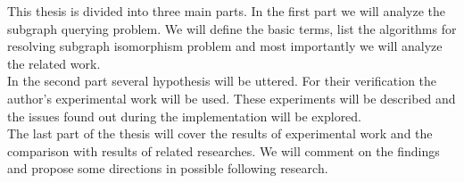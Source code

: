 This thesis is divided into three main parts. In the first part we will analyze the subgraph querying problem. We will define the basic terms, list the algorithms for resolving subgraph isomorphism problem and most importantly we will analyze the related work. \\

In the second part several hypothesis will be uttered. For their verification the author’s experimental work will be used. These experiments will be described and the issues found out during the implementation will be explored.\\

The last part of the thesis will cover the results of experimental work and the comparison with results of related researches. We will comment on the findings and propose some directions in possible following research.
